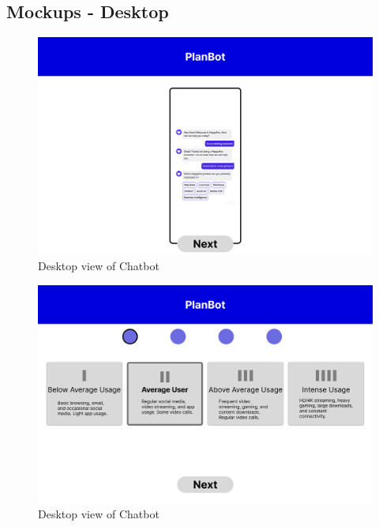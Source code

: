 \documentclass[conference]{IEEEtran}
\begin{document}
\subsection{Mockups - Desktop}
\begin{figure}[H]
    \centering
    \includegraphics[width=1\linewidth]{Desktop/Chatbot - DesktopDESKTOP.png}
    \caption{Desktop view of Chatbot}
    \label{fig:user flow}
\end{figure}
\begin{figure}[H]
    \centering
    \includegraphics[width=1\linewidth]{Desktop/Data Usage Profile - DesktopDESKTOP.png}
    \caption{Desktop view of Chatbot}
    \label{fig:user flow}
\end{figure}
\end{document}

